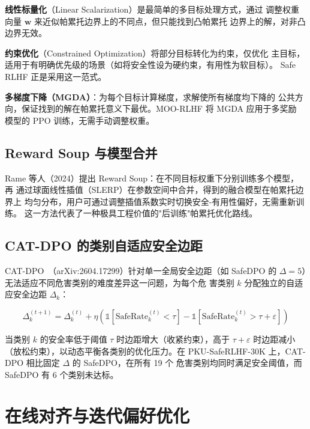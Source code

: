 \documentclass[12pt,a4paper,UTF8]{ctexart}
\begin{document}
\textbf{线性标量化}（Linear Scalarization）是最简单的多目标处理方式，通过
调整权重向量 $\mathbf{w}$ 来近似帕累托边界上的不同点，但只能找到凸帕累托
边界上的解，对非凸边界无效。

\textbf{约束优化}（Constrained Optimization）将部分目标转化为约束，仅优化
主目标，适用于有明确优先级的场景（如将安全性设为硬约束，有用性为软目标）。
Safe RLHF 正是采用这一范式。

\textbf{多梯度下降（MGDA）}：为每个目标计算梯度，求解使所有梯度均下降的
公共方向，保证找到的解在帕累托意义下最优。MOO-RLHF 将 MGDA 应用于多奖励
模型的 PPO 训练，无需手动调整权重。

\subsection{Reward Soup 与模型合并}

Rame 等人（2024）提出 Reward Soup：在不同目标权重下分别训练多个模型，再
通过球面线性插值（SLERP）在参数空间中合并，得到的融合模型在帕累托边界上
均匀分布，用户可通过调整插值系数实时切换安全-有用性偏好，无需重新训练。
这一方法代表了一种极具工程价值的"后训练"帕累托优化路线。

\subsection{CAT-DPO 的类别自适应安全边距}

CAT-DPO~\cite{catdpo2026}（arXiv:2604.17299）针对单一全局安全边距（如
SafeDPO 的 $\Delta=5$）无法适应不同危害类别的难度差异这一问题，为每个危
害类别 $k$ 分配独立的自适应安全边距 $\Delta_k$：

\begin{equation}
  \Delta_k^{(t+1)}
    = \Delta_k^{(t)} + \eta\!\left(
        \mathbb{1}\!\left[\mathrm{SafeRate}_k^{(t)} < \tau\right]
        - \mathbb{1}\!\left[\mathrm{SafeRate}_k^{(t)} > \tau + \varepsilon\right]
      \right)
\end{equation}

当类别 $k$ 的安全率低于阈值 $\tau$ 时边距增大（收紧约束），高于 $\tau+
\varepsilon$ 时边距减小（放松约束），以动态平衡各类别的优化压力。在
PKU-SafeRLHF-30K 上，CAT-DPO 相比固定 $\Delta$ 的 SafeDPO，在所有 19 个
危害类别均同时满足安全阈值，而 SafeDPO 有 6 个类别未达标。

\section{在线对齐与迭代偏好优化}
\label{sec:online}
\end{document}
